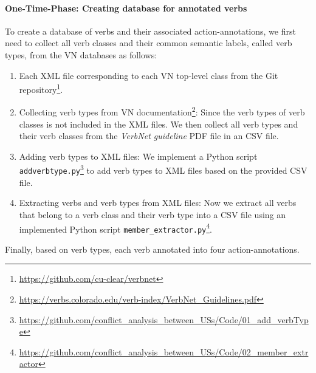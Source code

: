 \paragraph{One-Time-Phase: Creating database for annotated verbs}To create a database of verbs and their associated action-annotations, we first need to collect all verb classes and their common semantic labels, called verb types, from the VN databases as follows:
\begin{enumerate}
	\item Each XML file corresponding to each VN top-level class from the Git repository\footnote{\href{https://github.com/cu-clear/verbnet}{https://github.com/cu-clear/verbnet}}.
	
	\item Collecting verb types from VN documentation\footnote{\href{https://verbs.colorado.edu/verb-index/VerbNet_Guidelines.pdf}{https://verbs.colorado.edu/verb-index/VerbNet\_Guidelines.pdf}}: Since the verb types of verb classes is not included in the XML files. We then collect all verb types and their verb classes from the \textit{VerbNet guideline} PDF file in an CSV file.
	
	\item Adding verb types to XML files: We implement a Python script \texttt{addverbtype.py}\footnote{\href{https://github.com/amirrabieyannejad/conflict_analysis_between_USs/tree/main/Code/VN_Verb_Categorisation/01_add_verbType}{https://github.com/conflict\_analysis\_between\_USs/Code/01\_add\_verbType}} to add verb types to XML files based on the provided CSV file.
	
	\item Extracting verbs and verb types from XML files: Now we extract all verbs that belong to a verb class and their verb type into a CSV file using an implemented Python script \texttt{member\_extractor.py}\footnote{\href{https://github.com/amirrabieyannejad/conflict_analysis_between_USs/tree/main/Code/VN_Verb_Categorisation/02_member_extractor}{https://github.com/conflict\_analysis\_between\_USs/Code/02\_member\_extractor}}.
\end{enumerate}
Finally, based on verb types, each verb annotated into four action-annotations. 

